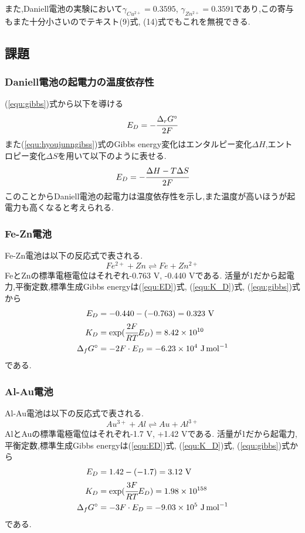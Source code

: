 また,Daniell電池の実験において$\gamma_{Cu^{2+}}=0.3595$, $\gamma_{Zn^{2+}}=0.3591$であり,この寄与もまた十分小さいのでテキスト(9)式, (14)式でもこれを無視できる.

\subsection{課題}
\subsubsection{Daniell電池の起電力の温度依存性}
(\ref{equ:gibbs})式から以下を導ける
\begin{equation}
  \label{equ:hyoujunngibss}
  E_D=-\cfrac{\Delta_rG^{\circ}}{2F}
\end{equation}
また(\ref{equ:hyoujunngibss})式のGibbs energy変化はエンタルピー変化$\Delta H$,エントロピー変化$\Delta S$を用いて以下のように表せる\cite{jiten}.
\begin{equation}
  \label{equ:enen}
  E_D=-\cfrac{\Delta H - T\Delta S}{2F}
\end{equation}
このことからDaniell電池の起電力は温度依存性を示し,また温度が高いほうが起電力も高くなると考えられる.
\subsubsection{Fe-Zn電池}
Fe-Zn電池は以下の反応式で表される.
\begin{equation*}
  Fe^{2+}+Zn\rightleftharpoons Fe+Zn^{2+}
\end{equation*}
FeとZnの標準電極電位はそれぞれ-0.763 \si{\volt}, -0.440 \si{\volt}である.
活量が1だから起電力,平衡定数,標準生成Gibbs energyは(\ref{equ:ED})式, (\ref{equ:K_D})式, (\ref{equ:gibbs})式から
\begin{align*}
  E_D&=-0.440-(-0.763)=0.323\ \si{\volt}\\
  K_D&=\exp(\cfrac{2F}{RT}E_D)=8.42\times10^{10}\\
  \Delta_fG^{\circ}&=-2F\cdot E_D=-6.23\times10^4\ \si{\joule.\mole^{-1}}
\end{align*}
である.
\subsubsection{Al-Au電池}
Al-Au電池は以下の反応式で表される.
\begin{equation*}
  Au^{3+}+Al\rightleftharpoons Au+Al^{3+}
\end{equation*}
AlとAuの標準電極電位はそれぞれ-1.7 \si{\volt}, +1.42 \si{\volt}である.
活量が1だから起電力,平衡定数,標準生成Gibbs energyは(\ref{equ:ED})式, (\ref{equ:K_D})式, (\ref{equ:gibbs})式から
\begin{align*}
  E_D&=1.42-(-1.7)=3.12\ \si{\volt}\\
  K_D&=\exp(\cfrac{3F}{RT}E_D)=1.98\times10^{158}\\
  \Delta_fG^{\circ}&=-3F\cdot E_D=-9.03\times10^5\ \si{\joule.\mole^{-1}}
\end{align*}
である.
